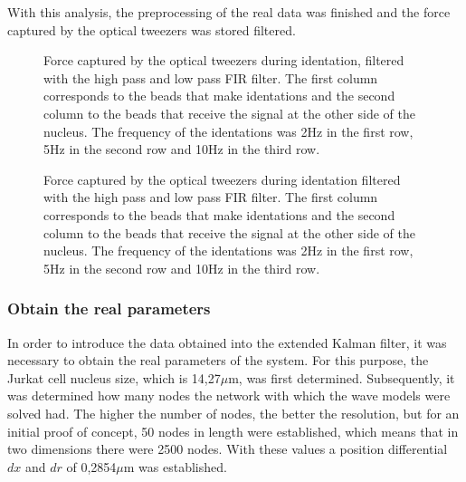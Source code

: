 \documentclass[12pt, a4paper]{article} %
\begin{document}
With this analysis, the preprocessing of the real data was finished and the force captured by the optical tweezers was stored filtered.

\newpage

\begin{figure}[htbp]
  \centering
  
  \caption{Force captured by the optical tweezers during identation, filtered with the high pass and low pass FIR filter. The first column corresponds to the beads that make identations and the second column to the beads that receive the signal at the other side of the nucleus. The frequency of the identations was 2Hz in the first row, 5Hz in the second row and 10Hz in the third row.}
  \label{fig:filtered_data}
\end{figure}

\begin{figure}[H]
    \centering
    
  \caption{Force captured by the optical tweezers during identation filtered with the high pass and low pass FIR filter. The first column corresponds to the beads that make identations and the second column to the beads that receive the signal at the other side of the nucleus. The frequency of the identations was 2Hz in the first row, 5Hz in the second row and 10Hz in the third row.}
  \label{fig:fourier_con_filtro_todo}
\end{figure}

\setlength{\parskip}{0mm}

\subsubsection{Obtain the real parameters}

In order to introduce the data obtained into the extended Kalman filter, it was necessary to obtain the real parameters of the system. For this purpose, the Jurkat cell nucleus size, which is 14,27$\mu$m, was first determined. Subsequently, it was determined how many nodes the network with which the wave models were solved had. The higher the number of nodes, the better the resolution, but for an initial proof of concept, 50 nodes in length were established, which means that in two dimensions there were 2500 nodes. With these values a position differential $dx$ and $dr$ of 0,2854$\mu$m was established.
\end{document}
